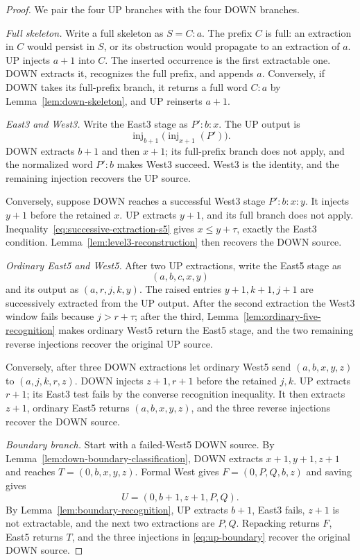 \documentclass[11pt]{article}
\theoremstyle{definition}
\theoremstyle{remark}
\newcommand{\inj}{\operatorname{inj}}
\begin{document}
\begin{proof}
We pair the four UP branches with the four DOWN branches.

\smallskip
\noindent\emph{Full skeleton.}
Write a full skeleton as $S=C:a$.  The prefix $C$ is full: an extraction in
$C$ would persist in $S$, or its obstruction would propagate to an
extraction of $a$.  UP injects $a+1$ into $C$.  The inserted occurrence is
the first extractable one.  DOWN extracts it, recognizes the full prefix,
and appends $a$.  Conversely, if DOWN takes its full-prefix branch, it
returns a full word $C:a$ by Lemma~\ref{lem:down-skeleton}, and UP reinserts
$a+1$.

\smallskip
\noindent\emph{East3 and West3.}
Write the East3 stage as $P':b:x$.  The UP output is
\[
 \inj_{b+1}\bigl(\inj_{x+1}(P')\bigr).
\]
DOWN extracts $b+1$ and then $x+1$; its full-prefix branch does not apply,
and the normalized word $P':b$ makes West3 succeed.  West3 is the identity,
and the remaining injection recovers the UP source.

Conversely, suppose DOWN reaches a successful West3 stage $P':b:x:y$.  It
injects $y+1$ before the retained $x$.  UP extracts $y+1$, and its full
branch does not apply.  Inequality~\eqref{eq:successive-extraction-s5} gives
$x\le y+\tau$, exactly the East3 condition.  Lemma~\ref{lem:level3-reconstruction}
then recovers the DOWN source.

\smallskip
\noindent\emph{Ordinary East5 and West5.}
After two UP extractions, write the East5 stage as
\[
 (a,b,c,x,y)
\]
and its output as $(a,r,j,k,y)$.  The raised entries $y+1,k+1,j+1$ are
successively extracted from the UP output.  After the second extraction the
West3 window fails because $j>r+\tau$; after the third,
Lemma~\ref{lem:ordinary-five-recognition} makes ordinary West5 return the
East5 stage, and the two remaining reverse injections recover the original
UP source.

Conversely, after three DOWN extractions let ordinary West5 send
$(a,b,x,y,z)$ to $(a,j,k,r,z)$.  DOWN injects $z+1,r+1$ before the retained
$j,k$.  UP extracts $r+1$; its East3 test fails by the converse recognition
inequality.  It then extracts $z+1$, ordinary East5 returns
$(a,b,x,y,z)$, and the three reverse injections recover the DOWN source.

\smallskip
\noindent\emph{Boundary branch.}
Start with a failed-West5 DOWN source.  By
Lemma~\ref{lem:down-boundary-classification}, DOWN extracts
$x+1,y+1,z+1$ and reaches $T=(0,b,x,y,z)$.  Formal West gives
$F=(0,P,Q,b,z)$ and saving gives
\[
 U=(0,b+1,z+1,P,Q).
\]
By Lemma~\ref{lem:boundary-recognition}, UP extracts $b+1$, East3 fails,
$z+1$ is not extractable, and the next two extractions are $P,Q$.
Repacking returns $F$, East5 returns $T$, and the three injections in
\eqref{eq:up-boundary} recover the original DOWN source.


\end{proof}
\end{document}
